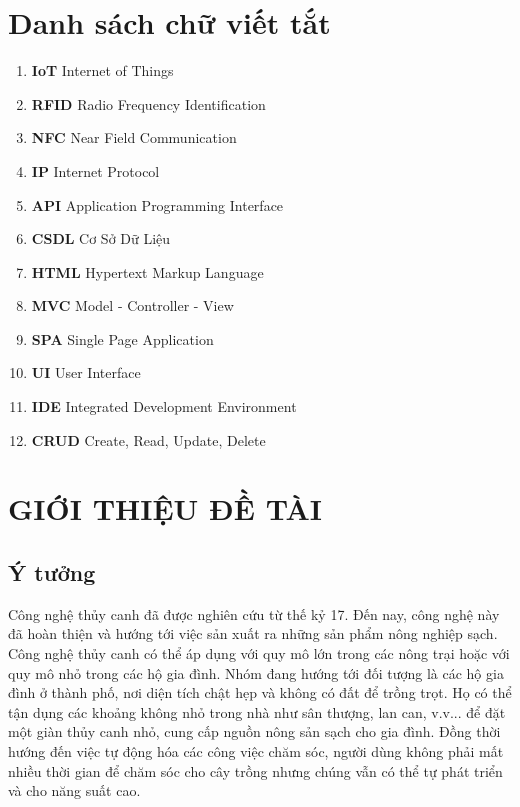 \documentclass[a4paper,12pt,oneside]{article}
\begin{document}
\newpage
\tableofcontents

\newpage
\listoffigures

\newpage
\listoftables

\newpage
\section*{Danh sách chữ viết tắt}
\label{sec:dsvt}

\begin{enumerate}
\item \textbf{IoT} Internet of Things
\item \textbf{RFID} Radio Frequency Identification
\item \textbf{NFC} Near Field Communication
\item \textbf{IP} Internet Protocol
\item \textbf{API} Application Programming Interface
\item \textbf{CSDL} Cơ Sở Dữ Liệu
\item \textbf{HTML} Hypertext Markup Language
\item \textbf{MVC} Model - Controller - View
\item \textbf{SPA} Single Page Application
\item \textbf{UI} User Interface
\item \textbf{IDE} Integrated Development
 Environment
 \item \textbf{CRUD} Create, Read, Update, Delete
\end{enumerate}

\newpage
{}
\section{GIỚI THIỆU ĐỀ TÀI}

\subsection{Ý tưởng}

\noindent Công nghệ thủy canh đã được nghiên cứu từ thế kỷ 17. Đến nay, công nghệ này đã hoàn thiện và hướng tới việc sản xuất ra những sản phẩm nông nghiệp sạch. Công nghệ thủy canh có thể áp dụng với quy mô lớn trong các nông trại hoặc với quy mô nhỏ trong các hộ gia đình. Nhóm đang hướng tới đối tượng là các hộ gia đình ở thành phố, nơi diện tích chật hẹp và không có đất để trồng trọt. Họ có thể tận dụng các khoảng không nhỏ trong nhà như sân thượng, lan can, v.v... để đặt một giàn thủy canh nhỏ, cung cấp nguồn nông sản sạch cho gia đình. Đồng thời hướng đến việc tự động hóa các công việc chăm sóc, người dùng không phải mất nhiều thời gian để chăm sóc cho cây trồng nhưng chúng vẫn có thể tự phát triển và cho năng suất cao.
\end{document}
